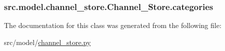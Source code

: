 \subsubsection[{categories}]{\setlength{\rightskip}{0pt plus 5cm}src.\+model.\+channel\+\_\+store.\+Channel\+\_\+\+Store.\+categories}\label{classsrc_1_1model_1_1channel__store_1_1Channel__Store_a9e2372569f733406cb55b8c2610b0bf3}


The documentation for this class was generated from the following file\+:\begin{DoxyCompactItemize}
\item 
src/model/\hyperlink{channel__store_8py}{channel\+\_\+store.\+py}\end{DoxyCompactItemize}
